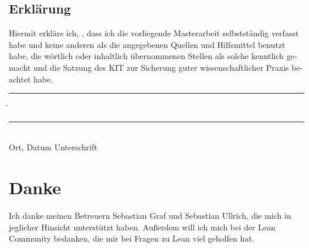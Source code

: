 \documentclass[parskip=no,12pt,a4paper,twoside,headings=openright]{scrreprt}
\begin{document}
\begin{otherlanguage}{ngerman}
	\chapter*{Erklärung}
	\pagestyle{empty}

	\vspace{20mm}
	Hiermit erkläre ich, \theauthor, dass ich die vorliegende Masterarbeit selbst\-ständig
	verfasst habe und keine anderen als die angegebenen Quellen und Hilfsmittel
	benutzt habe, die wörtlich oder inhaltlich übernommenen Stellen als solche kenntlich gemacht und
	die Satzung des KIT zur Sicherung guter wissenschaftlicher Praxis beachtet habe.
	\vspace{20mm}
	\begin{tabbing}
		\rule{7cm}{.4pt}\hspace{1cm} \= \rule{6.8cm}{.4pt} \\
		Ort, Datum \> Unterschrift
	\end{tabbing}
\end{otherlanguage}

\chapter*{Danke}
\pagestyle{empty}

Ich danke meinen Betreuern Sebastian Graf und Sebastian Ullrich, die mich in jeglicher Hinsicht unterstützt haben.
Außerdem will ich mich bei der Lean Community bedanken, die mir bei Fragen zu Lean viel geholfen hat.

\pagestyle{fancy}
\end{document}
